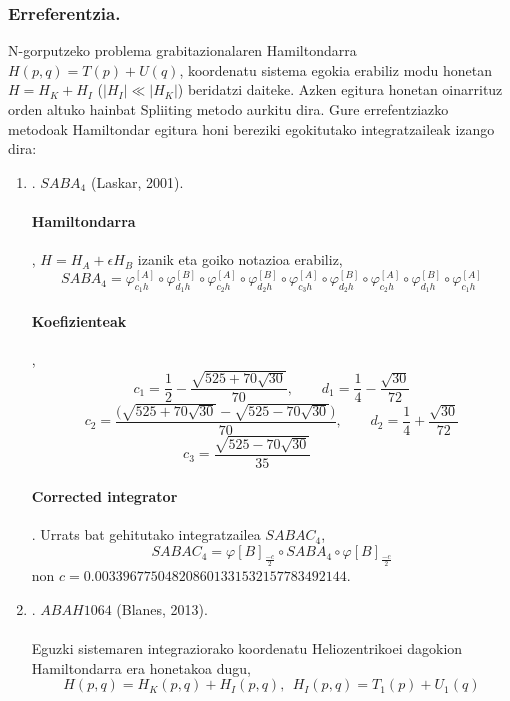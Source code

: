 \subsubsection{Erreferentzia.}

N-gorputzeko problema grabitazionalaren Hamiltondarra $H(p,q)=T(p)+U(q)$, koordenatu sistema egokia erabiliz modu honetan $H=H_K+H_I$ ($|H_I|\ll|H_K|$) beridatzi daiteke. Azken egitura honetan oinarrituz orden altuko hainbat Spliiting metodo aurkitu dira. Gure errefentziazko metodoak Hamiltondar egitura honi bereziki egokitutako integratzaileak izango dira:

\begin{enumerate}
\item. $SABA_4$ (Laskar, 2001).

\paragraph*{Hamiltondarra}, $H=H_A+\epsilon H_B$ izanik eta goiko notazioa erabiliz,
\[SABA_4=\varphi^{[A]}_{c_1 h} \circ \varphi^{[B]}_{d_1 h} \circ \varphi^{[A]}_{c_2 h} \circ \varphi^{[B]}_{d_2 h}
         \circ  \varphi^{[A]}_{c_3 h}   \circ
          \varphi^{[B]}_{d_2 h} \circ \varphi^{[A]}_{c_2 h} \circ   \varphi^{[B]}_{d_1 h}\circ  \varphi^{[A]}_{c_1 h}
\]

\paragraph*{Koefizienteak},
\[c_1=\frac{1}{2}-\frac{\sqrt{525+70\sqrt{30}}}{70} , \ \ \ \ \ \ \ \ \ d_1=\frac{1}{4}-\frac{\sqrt{30}}{72}\]
\[c_2=\frac{\big( \sqrt{525+70 \sqrt{30}}-\sqrt{525-70 \sqrt{30}} \big)}{70} , \ \ \ \ \ \ \ \ \ d_2=\frac{1}{4}+\frac{\sqrt{30}}{72}\]
\[c_3=\frac{\sqrt{525-70\sqrt{30}}}{35} \ \ \ \ \ \ \ \ \ \ \ \ \ \ \ \ \]

\paragraph*{Corrected integrator}.
Urrats bat gehitutako integratzailea $SABAC_4$,
\[SABAC_4=\varphi{[B]}_\frac{-c}{2} \circ SABA_4 \circ \varphi{[B]}_\frac{-c}{2}\] 
non $c=0.003396775048208601331532157783492144$.\\

\item. $ABAH1064$ (Blanes, 2013).

\paragraph*{}Eguzki sistemaren integraziorako koordenatu Heliozentrikoei dagokion Hamiltondarra era honetakoa dugu,
\begin{equation*}
H(p,q)=H_K(p,q)+H_I(p,q), \ \ H_I(p,q)=T_1(p)+U_1(q) 
\end{equation*}


\end{enumerate}
